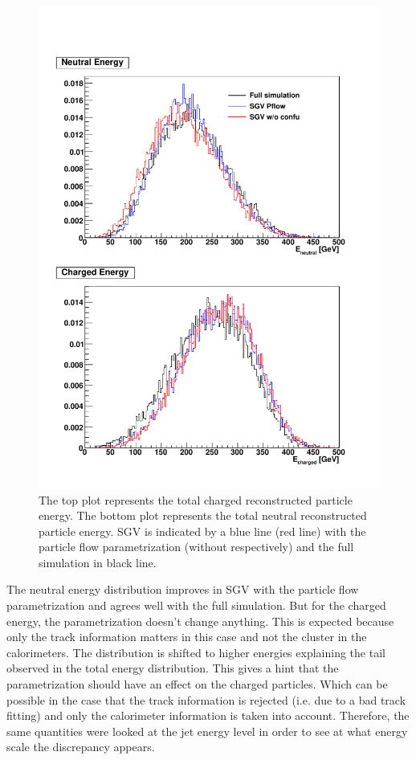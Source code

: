 \begin{figure}[htbp!]
  \centering
  \includegraphics[width=1\linewidth]{../Thesis_Plots/SGV/Plots/Total_EneuEcha_notjet.pdf}
  \caption{The top plot represents the total charged reconstructed particle energy. The bottom plot represents the total neutral reconstructed particle energy. SGV is indicated by a blue line (red line) with the particle flow parametrization (without respectively) and the full simulation in black line.}
  \label{fig:energy_charged_neutral}
\end{figure}

The neutral energy distribution improves in SGV with the particle flow parametrization and agrees well with the full simulation. But for the charged energy, the parametrization doesn't change anything. This is expected because only the track information matters in this case and not the cluster in the calorimeters. The distribution is shifted to higher energies explaining the tail observed in the total energy distribution. This gives a hint that the parametrization should have an effect on the charged particles. Which can be possible in the case that the track information is rejected (i.e. due to a bad track fitting) and only the calorimeter information is taken into account. Therefore, the same quantities were looked at the jet energy level in order to see at what energy scale the discrepancy appears.

